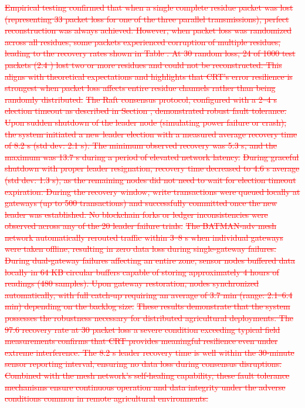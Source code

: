 \documentclass[pdflatex,sn-mathphys-num]{sn-jnl}
\theoremstyle{thmstyleone}
\theoremstyle{thmstyletwo}
\theoremstyle{thmstylethree}
\begin{document}
{\textcolor{red}{\sout{Empirical testing confirmed that when a single complete residue packet was lost (representing 33 packet loss for one of the three parallel transmissions), perfect reconstruction was always achieved. However, when packet loss was randomized across all residues, some packets experienced corruption of multiple residues, leading to the recovery rates shown in Table . At 30 random loss, 24 of 1000 test packets (2.4 ) lost two or more residues and could not be reconstructed. This aligns with theoretical expectations and highlights that CRT's error resilience is strongest when packet loss affects entire residue channels rather than being randomly distributed.}}
\textcolor{red}{\sout{The Raft consensus protocol, configured with a 2–4 s election timeout as described in Section , demonstrated robust fault tolerance. Upon sudden shutdown of the leader node (simulating power failure or crash), the system initiated a new leader election with a measured average recovery time of 8.2 s (std dev: 2.1 s). The minimum observed recovery was 5.3 s, and the maximum was 13.7 s during a period of elevated network latency.}}
\textcolor{red}{\sout{During graceful shutdown with proper leader resignation, recovery time decreased to 4.6 s average (std dev: 1.3 s), as the remaining nodes did not need to wait for election timeout expiration. During the recovery window, write transactions were queued locally at gateways (up to 500 transactions) and successfully committed once the new leader was established. No blockchain forks or ledger inconsistencies were observed across any of the 20 leader failure trials.}}
\textcolor{red}{\sout{The BATMAN-adv mesh network automatically rerouted traffic within 3–8 s when individual gateways were taken offline, resulting in zero data loss during single‑gateway failures. During dual‑gateway failures affecting an entire zone, sensor nodes buffered data locally in 64 KB circular buffers capable of storing approximately 4 hours of readings (480 samples). Upon gateway restoration, nodes synchronized automatically, with full catch‑up requiring an average of 3.7 min (range: 2.1–6.4 min) depending on the backlog size.}}
\textcolor{red}{\sout{These results demonstrate that the system possesses the robustness necessary for distributed agricultural deployments. The 97.6 recovery rate at 30 packet loss a severe condition exceeding typical field measurements confirms that CRT provides meaningful resilience even under extreme interference. The 8.2 s leader recovery time is well within the 30‑minute sensor reporting interval, ensuring no data loss during consensus disruptions. Combined with the mesh network's self‑healing capability, these fault tolerance mechanisms ensure continuous operation and data integrity under the adverse conditions common in remote agricultural environments.}}
}
\end{document}

